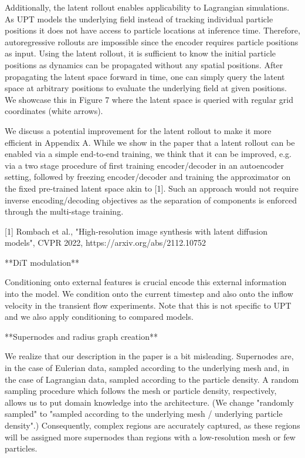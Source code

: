 Additionally, the latent rollout enables applicability to Lagrangian simulations. As UPT models the underlying field instead of tracking individual particle positions it does not have access to particle locations at inference time. Therefore, autoregressive rollouts are impossible since the encoder requires particle positions as input. Using the latent rollout, it is sufficient to know the initial particle positions as dynamics can be propagated without any spatial positions. After propagating the latent space forward in time, one can simply query the latent space at arbitrary positions to evaluate the underlying field at given positions. We showcase this in Figure 7 where the latent space is queried with regular grid coordinates (white arrows).


We discuss a potential improvement for the latent rollout to make it more efficient in Appendix A. While we show in the paper that a latent rollout can be enabled via a simple end-to-end training, we think that it can be improved, e.g. via a two stage procedure of first training encoder/decoder in an autoencoder setting, followed by freezing encoder/decoder and training the approximator on the fixed pre-trained latent space akin to [1]. Such an approach would not require inverse encoding/decoding objectives as the separation of components is enforced through the multi-stage training.

[1] Rombach et al., "High-resolution image synthesis with latent diffusion models", CVPR 2022, https://arxiv.org/abs/2112.10752

**DiT modulation**

Conditioning onto external features is crucial encode this external information into the model. We condition onto the current timestep and also onto the inflow velocity in the transient flow experiments.
Note that this is not specific to UPT and we also apply conditioning to compared models.






**Supernodes and radius graph creation**


We realize that our description in the paper is a bit misleading. Supernodes are, in the case of Eulerian data, sampled according to the underlying mesh and, in the case of Lagrangian data, sampled according to the particle density. A random sampling procedure which follows the mesh or particle density, respectively, allows us to put domain knowledge into the architecture. (We change "randomly sampled" to "sampled according to the underlying mesh / underlying particle density".)
Consequently, complex regions are accurately captured, as these regions will be assigned more supernodes than regions with a low-resolution mesh or few particles.




